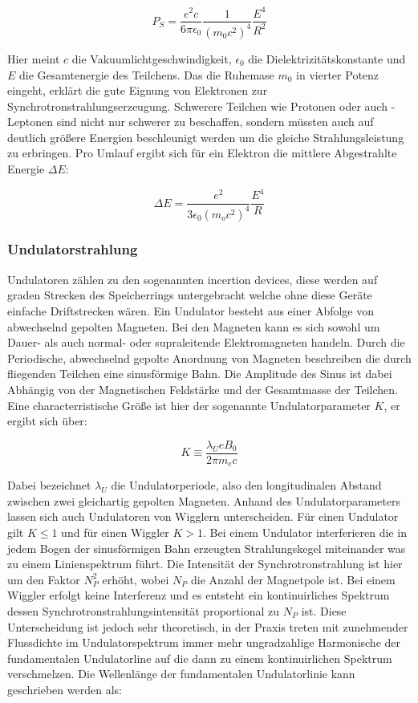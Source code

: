 \begin{equation*}
    P_S = \frac{e^2c}{6\pi \epsilon_0}\frac{1}{(m_0c^2)^4}\frac{E^4}{R^2}
\end{equation*}

Hier meint $c$ die Vakuumlichtgeschwindigkeit, $\epsilon_0$ die Dielektrizitätskonstante 
und $E$ die Gesamtenergie des Teilchens. Das die Ruhemase $m_0$ in vierter Potenz eingeht,
erklärt die gute Eignung von Elektronen zur Synchrotronstrahlungserzeugung. Schwerere 
Teilchen wie Protonen oder auch \tau-Leptonen sind nicht nur schwerer zu beschaffen, sondern
müssten auch auf deutlich größere Energien beschleunigt werden um die gleiche Strahlungsleistung
zu erbringen. Pro Umlauf ergibt sich für ein Elektron die mittlere Abgestrahlte Energie $\Delta E$:

\begin{equation*}
    \Delta E = \frac{e^2}{3\epsilon_0(m_oc^2)^4}\frac{E^4}{R}
\end{equation*}

\subsubsection{Undulatorstrahlung}
\label{sec:Undulatorstrahlung}
Undulatoren zählen zu den sogenannten incertion devices, diese werden auf graden Strecken des 
Speicherrings untergebracht welche ohne diese Geräte einfache Driftstrecken wären. Ein Undulator besteht
aus einer Abfolge von abwechselnd gepolten Magneten. Bei den Magneten kann es sich sowohl um Dauer- als
auch normal- oder supraleitende Elektromagneten handeln. Durch die Periodische, abwechselnd gepolte 
Anordnung von Magneten beschreiben die durch fliegenden Teilchen eine sinusförmige Bahn. Die Amplitude des 
Sinus ist dabei Abhängig von der Magnetischen Feldstärke und der Gesamtmasse der Teilchen. Eine 
characterristische Größe ist hier der sogenannte Undulatorparameter $K$, er ergibt sich über:

\begin{equation*}
    K \equiv \frac{\lambda_U e B_0}{2 \pi m_e c}
\end{equation*}

Dabei bezeichnet $\lambda_U$ die Undulatorperiode, also den longitudinalen Abstand zwischen zwei 
gleichartig gepolten Magneten. Anhand des Undulatorparameters lassen sich auch Undulatoren von Wigglern
unterscheiden. Für einen Undulator gilt $K \leq 1$ und für einen Wiggler $K > 1$. Bei einem Undulator 
interferieren die in jedem Bogen der sinusförmigen Bahn erzeugten Strahlungskegel miteinander was zu
einem Linienspektrum führt. Die Intensität der Synchrotronstrahlung ist hier um den Faktor $N_P^2$ 
erhöht, wobei $N_P$ die Anzahl der Magnetpole ist. Bei einem Wiggler erfolgt keine Interferenz und 
es entsteht ein kontinuirliches Spektrum dessen Synchrotronstrahlungsintensität proportional zu $N_P$ ist.
Diese Unterscheidung ist jedoch sehr theoretisch, in der Praxis treten mit zunehmender Flussdichte im 
Undulatorspektrum immer mehr ungradzahlige Harmonische der fundamentalen Undulatorline auf die dann zu 
einem kontinuirlichen Spektrum verschmelzen. Die Wellenlänge der fundamentalen Undulatorlinie kann 
geschrieben werden als:

